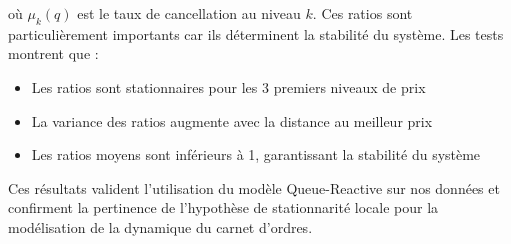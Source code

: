 \documentclass[12pt,a4paper]{article}
\theoremstyle{definition}
\theoremstyle{remark}
\begin{document}
où $\mu_k(q)$ est le taux de cancellation au niveau $k$. Ces ratios sont particulièrement importants car ils déterminent la stabilité du système. Les tests montrent que :

\begin{itemize}
    \item Les ratios sont stationnaires pour les 3 premiers niveaux de prix
    \item La variance des ratios augmente avec la distance au meilleur prix
    \item Les ratios moyens sont inférieurs à 1, garantissant la stabilité du système
\end{itemize}

Ces résultats valident l'utilisation du modèle Queue-Reactive sur nos données et confirment la pertinence de l'hypothèse de stationnarité locale pour la modélisation de la dynamique du carnet d'ordres.
\end{document}

